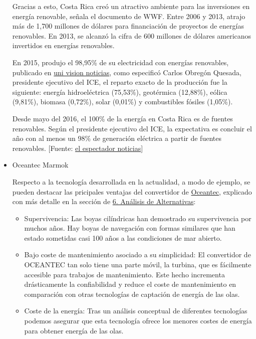 \begin{itemize}
  Gracias a esto, Costa Rica creó un atractivo ambiente para las
  inversiones en energía renovable, señala el documento de WWF. Entre
  2006 y 2013, atrajo más de 1,700 millones de dólares para financiación
  de proyectos de energías renovables. En 2013, se alcanzó la cifra de
  600 millones de dólares americanos invertidos en energías renovables.

  En 2015, produjo el 98,95\% de su electricidad con energías
  renovables, publicado en
  \href{https://www.univision.com/noticias/energias-renovables/costa-rica-ha-producido-el-99-de-su-electricidad-con-renovables-en-2015}{uni
  vision noticias}, como especificó Carlos Obregón Quesada, presidente
  ejecutivo del ICE, el reparto exacto de la producción fue la
  siguiente: energía hidroeléctrica (75,53\%), geotérmica (12,88\%),
  eólica (9,81\%), biomasa (0,72\%), solar (0,01\%) y combustibles
  fósiles (1,05\%).

  Desde mayo del 2016, el 100\% de la energía en Costa Rica es de
  fuentes renovables. Según el presidente ejecutivo del ICE, la
  expectativa es concluir el año con al menos un 98\% de generación
  eléctrica a partir de fuentes renovables. {[}Fuente:
  \href{http://www.elespectador.com/noticias/medio-ambiente/mayo-el-100-de-energia-costa-rica-de-fuentes-renovables-articulo-647158}{el
  espectador noticias}{]}
\item
  Oceantec Marmok

  Respecto a la tecnología desarrollada en la actualidad, a modo de
  ejemplo, se pueden destacar las pricipales ventajas del convertidor de
  \href{http://www.oceantecenergy.com/desarrollo-tecnologico/}{Oceantec},
  explicado con más detalle en la sección de \href{}{6. Análisis de
  Alternativas}:

  \begin{itemize}
  \item
    Supervivencia: Las boyas cilíndricas han demostrado su supervivencia
    por muchos años. Hay boyas de navegación con formas similares que
    han estado sometidas casi 100 años a las condiciones de mar abierto.
  \item
    Bajo coste de mantenimiento asociado a su simplicidad: El
    convertidor de OCEANTEC tan solo tiene una parte móvil, la turbina,
    que es fácilmente accesible para trabajos de mantenimiento. Este
    hecho incrementa drásticamente la confiabilidad y reduce el coste de
    mantenimiento en comparación con otras tecnologías de captación de
    energía de las olas.
  \item
    Coste de la energía: Tras un análisis conceptual de diferentes
    tecnologías podemos asegurar que esta tecnología ofrece los menores
    costes de energía para obtener energía de las olas.
  \end{itemize}
\end{itemize}
